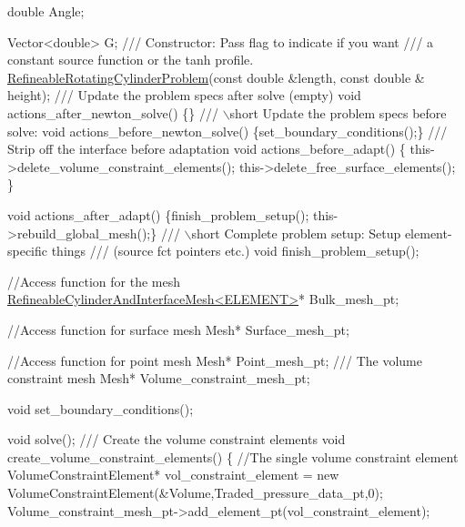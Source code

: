 \begin{DoxyCodeInclude}
 \textcolor{keywordtype}{double} Angle;

 Vector<double> G;
\textcolor{comment}{}
\textcolor{comment}{ /// Constructor: Pass flag to indicate if you want}
\textcolor{comment}{ /// a constant source function or the tanh profile.}
\textcolor{comment}{} \hyperlink{classRefineableRotatingCylinderProblem}{RefineableRotatingCylinderProblem}(\textcolor{keyword}{const} \textcolor{keywordtype}{double} &length, \textcolor{keyword}{const} \textcolor{keywordtype}{double} &
      height);
\textcolor{comment}{}
\textcolor{comment}{ /// Update the problem specs after solve (empty)}
\textcolor{comment}{} \textcolor{keywordtype}{void} actions\_after\_newton\_solve() \{\}
\textcolor{comment}{}
\textcolor{comment}{ /// \(\backslash\)short Update the problem specs before solve: }
\textcolor{comment}{} \textcolor{keywordtype}{void} actions\_before\_newton\_solve() \{set\_boundary\_conditions();\}
\textcolor{comment}{}
\textcolor{comment}{ /// Strip off the interface before adaptation}
\textcolor{comment}{} \textcolor{keywordtype}{void} actions\_before\_adapt() 
  \{
   this->delete\_volume\_constraint\_elements();
   this->delete\_free\_surface\_elements();
  \}

 \textcolor{keywordtype}{void} actions\_after\_adapt() \{finish\_problem\_setup(); this->rebuild\_global\_mesh();\}
\textcolor{comment}{}
\textcolor{comment}{ /// \(\backslash\)short Complete problem setup: Setup element-specific things }
\textcolor{comment}{ /// (source fct pointers etc.)}
\textcolor{comment}{} \textcolor{keywordtype}{void} finish\_problem\_setup();

 \textcolor{comment}{//Access function for the mesh}
 \hyperlink{classRefineableCylinderAndInterfaceMesh}{RefineableCylinderAndInterfaceMesh<ELEMENT>}* Bulk\_mesh\_pt;

 \textcolor{comment}{//Access function for surface mesh}
 Mesh* Surface\_mesh\_pt;

 \textcolor{comment}{//Access function for point mesh}
 Mesh* Point\_mesh\_pt;
\textcolor{comment}{}
\textcolor{comment}{ /// The volume constraint mesh }
\textcolor{comment}{} Mesh* Volume\_constraint\_mesh\_pt;

 \textcolor{keywordtype}{void} set\_boundary\_conditions();

 \textcolor{keywordtype}{void} solve();
\textcolor{comment}{}
\textcolor{comment}{ /// Create the volume constraint elements}
\textcolor{comment}{} \textcolor{keywordtype}{void} create\_volume\_constraint\_elements()
  \{
   \textcolor{comment}{//The single volume constraint element}
   VolumeConstraintElement* vol\_constraint\_element = 
    \textcolor{keyword}{new} VolumeConstraintElement(&Volume,Traded\_pressure\_data\_pt,0);
   Volume\_constraint\_mesh\_pt->add\_element\_pt(vol\_constraint\_element);
   

\end{DoxyCodeInclude}
